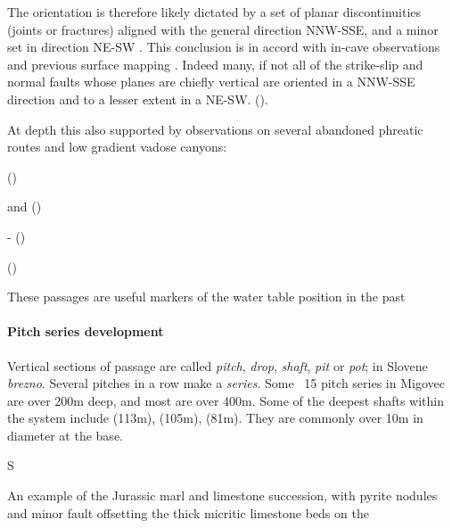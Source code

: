 The orientation is therefore likely dictated by a set of planar discontinuities (joints or fractures) aligned with the general direction NNW-SSE, and a minor set in direction NE-SW . This conclusion is in accord with in-cave observations \citep{hm1}  and previous surface mapping \citep{buser1986tolmavc} . Indeed many, if not all of the strike-slip and normal faults whose planes are chiefly vertical are oriented in a NNW-SSE direction and to a lesser extent in a NE-SW. ().

At depth this also supported by observations on several abandoned phreatic routes and low gradient vadose canyons:
 
\begin{citemize} 
\item {} ()
\item {} and   ()
 \item {} -  ()
 \item {} ()
 \end{citemize} 

These passages are useful markers of the water table position in the past


\paragraph{Pitch series development}
 Vertical sections of passage are called \emph{pitch}, \emph{drop}, \emph{shaft}, \emph{pit} or \emph{pot}; in Slovene \emph{brezno}. 
 Several pitches in a row make a \emph{series}. Some ~15 pitch series in Migovec are over 200m deep, and most are over 400m.
Some of the deepest shafts within the system include  (113m),  (105m),  (81m). They are commonly over 10m in diameter at the base. 

S 

\begin{marginfigure}
\checkoddpage \ifoddpage \forcerectofloat \else \forceversofloat \fi
\centering
 \caption{An example of the Jurassic marl and limestone succession, with pyrite nodules and minor fault offsetting the thick micritic limestone beds  on the \protect{}}
 \label{marls and limestones}
\end{marginfigure}


